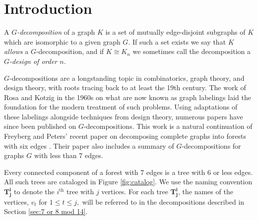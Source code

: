 \chapter{Introduction}
\label{intro_chapter}
A \textit{$G$-decomposition} of a graph $K$ is a set of mutually edge-disjoint subgraphs of $K$ which are isomorphic to a given graph $G$. If such a set exists we say that $K$ \textit{allows} a $G$-decomposition, and if $K\cong K_{n}$ we sometimes call the decomposition a \textit{$G$-design of order $n$}.

$G$-decompositions are a longstanding topic in combinatorics, graph theory, and design theory, with roots tracing back to at least the 19th century. The work of Rosa and Kotzig in the 1960s on what are now known as graph labelings laid the foundation for the modern treatment of such problems. Using adaptations of these labelings alongside techniques from design theory, numerous papers have since been published on $G$-decompositions. This work is a natural continuation of Freyberg and Peters' recent paper on decomposing complete graphs into forests with six edges \cite{bib:Peters}. Their paper also includes a summary of $G$-decompositions for graphs $G$ with less than 7 edges.

Every connected component of a forest with 7 edges is a tree with 6 or less edges. All such trees are cataloged in Figure \ref{fig:catalog}. We use the naming convention $\mathbf{T_{j}^i}$ to denote the $i^{\textrm{th}}$ tree with $j$ vertices. For each tree $\mathbf{T_{j}^i}$, the names of the vertices, $v_t$ for $1 \leq t \leq j,$ will be referred to in the decompositions described in Section \ref{sec:7 or 8 mod 14}.

